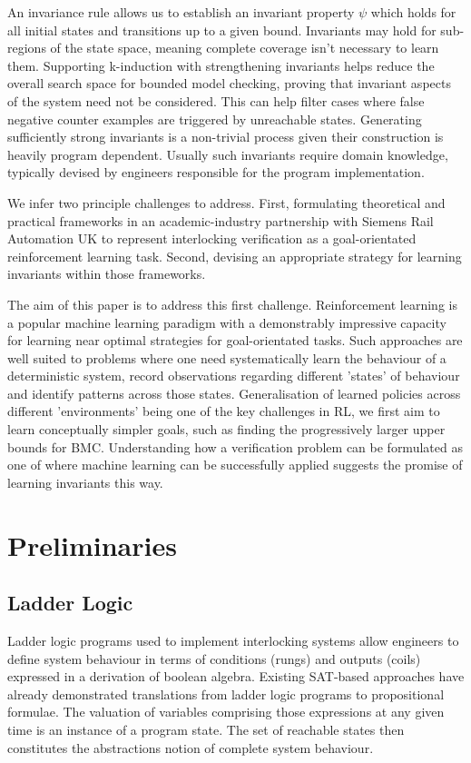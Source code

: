 \documentclass[runningheads]{llncs}
\begin{document}
An invariance rule allows us to establish an invariant property $\psi$ which holds for all initial states and transitions up to a given bound. Invariants may hold for sub-regions of the state space, meaning complete coverage isn't necessary to learn them. Supporting k-induction with strengthening invariants helps reduce the overall search space for bounded model checking, proving that invariant aspects of the system need not be considered. This can help filter cases where false negative counter examples are triggered by unreachable states. Generating sufficiently strong invariants is a non-trivial process given their construction is heavily program dependent. Usually such invariants require domain knowledge, typically devised by engineers responsible for the program implementation. 

We infer two principle challenges to address. First, formulating theoretical and practical frameworks in an academic-industry partnership with Siemens Rail Automation UK to represent interlocking verification as a goal-orientated reinforcement learning task. Second, devising an appropriate strategy for learning invariants within those frameworks.

The aim of this paper is to address this first challenge. Reinforcement learning is a popular machine learning paradigm with a demonstrably impressive capacity for learning near optimal strategies for goal-orientated tasks. Such approaches are well suited to problems where one need systematically learn the behaviour of a deterministic system, record observations regarding different 'states' of behaviour and identify patterns across those states. Generalisation of learned policies across different 'environments' being one of the key challenges in RL, we first aim to learn conceptually simpler goals, such as finding the progressively larger upper bounds for BMC. Understanding how a verification problem can be formulated as one of where machine learning can be successfully applied suggests the promise of learning invariants this way.


\section{Preliminaries}\label{sec:preliminaries}

\subsection{Ladder Logic}
Ladder logic programs used to implement interlocking systems allow engineers to define system behaviour in terms of conditions (rungs) and outputs (coils) expressed in a derivation of boolean algebra. Existing SAT-based approaches have already demonstrated translations from ladder logic programs to propositional formulae. The valuation of variables comprising those expressions at any given time is an instance of a program state. The set of reachable states then constitutes the abstractions notion of complete system behaviour.
\end{document}
